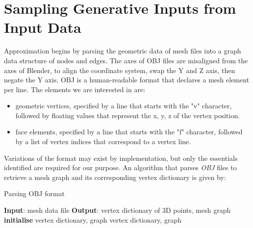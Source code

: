 \documentclass[ %
author={Dillon Keith Diep},
supervisor={Dr. Carl Henrik Ek},
degree={MEng},
title={ART-CG Hair:},
subtitle={Assisted Real-time Content Generation of Stylised Virtual Hair},
type={Research},
year={2017} ]{dissertation}
\begin{document}
\section{Sampling Generative Inputs from Input Data}

Approximation begins by parsing the geometric data of mesh files into a graph data structure of nodes and edges. The axes of OBJ files are misaligned from the axes of Blender, to align the coordinate system, swap the Y and Z axis, then negate the Y axis. OBJ is a human-readable format that declares a mesh element per line. The elements we are interested in are:
\begin{itemize}
	\item geometric vertices, specified by a line that starts with the "v" character, followed by floating values that represent the x, y, z of the vertex position.
	\item face elements, specified by a line that starts with the "f" character, followed by a list of vertex indices that correspond to a vertex line.
\end{itemize}
Variations of the format may exist by implementation, but only the essentials identified are required for our purpose. An algorithm that parses \textit{OBJ} files to retrieve a mesh graph and its corresponding vertex dictionary is given by:

\begin{algorithm}[!h]
	\caption{Parsing OBJ format}
	\algrule
	\textbf{Input}: mesh data file\;
	\textbf{Output}: vertex dictionary of 3D points, mesh graph\;
	\algrule
	\textbf{initialise} vertex dictionary, graph\;
	\Return vertex dictionary, graph
\end{algorithm}
\end{document}

